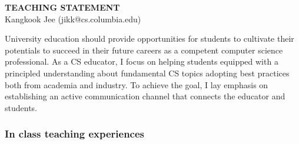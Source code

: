 \documentclass[letterpaper, 10pt]{article}
\begin{document}
\thispagestyle{fancy}

\lhead{}
\rhead{}

\renewcommand{\headrulewidth}{0pt} 
\renewcommand{\footrulewidth}{0pt} 

\fancyfoot[C]{\footnotesize
        \textcolor{gray}{http://www.cs.columbia.edu/$\sim$jikk/application}} 

\pagestyle{fancy}
\lhead{\textcolor{gray}{\it Kangkook Jee}}
\rhead{\textcolor{gray}{\thepage /\pageref{LastPage}}}

\begin{small}

\begin{center} {\LARGE \bf TEACHING STATEMENT}\\ \vspace*{0.1cm} {\normalsize
Kangkook Jee (jikk@cs.columbia.edu)} \end{center}
University education should provide opportunities for students to cultivate
their potentials to succeed in their future careers as a competent computer
science professional.  
%
As a CS educator, I focus on helping students equipped with a principled
understanding about fundamental CS topics adopting best practices both from
academia and industry.
%
To achieve the goal, I lay emphasis on establishing an active communication
channel that connects the educator and students.

\vspace{-2pt}
\subsubsection*{In class teaching experiences}


\end{small}
\end{document}
